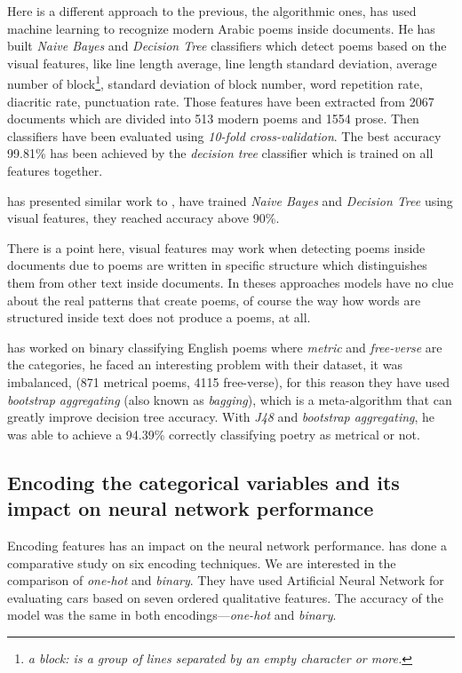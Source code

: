 \documentclass[12pt]{report}
\begin{document}
Here is a different approach to the previous, the algorithmic ones,
\citet{Almuhareb2015} has used machine learning to recognize modern Arabic poems
inside documents.  He has built \textit{Naive Bayes} and \textit{Decision Tree}
classifiers which detect poems based on the visual features, like line
length average, line length standard deviation, average number of block\footnote{
\textit{a block: is a group of lines separated by an empty character or more.}}, standard
deviation of block number, word repetition rate, diacritic rate, punctuation
rate. Those features have been extracted from 2067 documents which are
divided into 513 modern poems and 1554 prose.
Then classifiers have been evaluated using \textit{10-fold cross-validation}. 
The best accuracy 99.81\% has been achieved by the \textit{decision tree}
classifier which is trained on all features together.

\citet{Tizhoosh2006a} has presented similar work to \citet{Almuhareb2015}, have
trained \textit{Naive Bayes} and \textit{Decision Tree}
using visual features, they reached accuracy above 90\%.

There is a point here, visual features may work when detecting poems inside
documents due to poems are written in specific structure which distinguishes
them from other text inside documents. In theses approaches models have no clue
about the real patterns that create poems, of course the way how words are structured
inside text does not produce a poems, at all.


\citet{Tanasescu2016} has worked on binary classifying English poems where
\textit{metric} and \textit{free-verse} are the categories, he faced an
interesting problem with their dataset, it was imbalanced, (871 metrical poems,
4115 free-verse), for this reason they have used \textit{bootstrap aggregating}
(also known as \textit{bagging}), which is a meta-algorithm that can greatly
improve decision tree accuracy.  With \textit{J48} and \textit{bootstrap
aggregating}, he was able to achieve a 94.39\% correctly classifying poetry as
metrical or not.

\subsection*{Encoding the categorical variables and  its impact on neural network performance}
Encoding features has an impact on the neural network performance.
\citet{Potdar2017} has done a comparative study on six encoding techniques.  We
are interested in the comparison of \textit{one-hot} and \textit{binary}. They
have used Artificial Neural Network for evaluating cars based on seven ordered
qualitative features. The accuracy of the model was the same in both
encodings---\textit{one-hot} and \textit{binary}.
\end{document}
